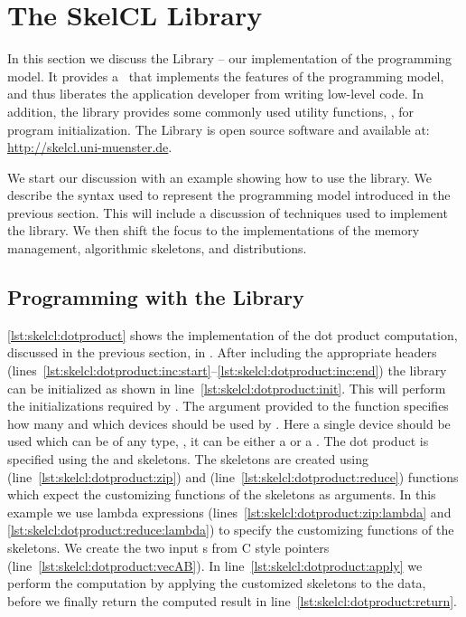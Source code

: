 \section{The SkelCL Library}
\label{section:skelcl-library}
In this section we discuss the \SkelCL Library -- our implementation of the \SkelCL programming model.
It provides a \Cpp~\API that implements the features of the \SkelCL programming model, and thus liberates the application developer from writing low-level code.
In addition, the library provides some commonly used utility functions, \eg, for program initialization.
The \SkelCL Library is open source software and available at: \url{http://skelcl.uni-muenster.de}.

We start our discussion with an example showing how to use the \SkelCL library.
We describe the syntax used to represent the \SkelCL programming model introduced in the previous section.
This will include a discussion of \Cpp techniques used to implement the library.
We then shift the focus to the implementations of the memory management, algorithmic skeletons, and distributions.










\subsection{Programming with the \SkelCL Library}

\autoref{lst:skelcl:dotproduct} shows the implementation of the dot product computation, discussed in the previous section, in \SkelCL.
After including the appropriate \SkelCL headers (lines~\autoref{lst:skelcl:dotproduct:inc:start}--\autoref{lst:skelcl:dotproduct:inc:end}) the \SkelCL library can be initialized as shown in line~\autoref{lst:skelcl:dotproduct:init}.
This will perform the initializations required by \OpenCL.
The argument provided to the  function specifies how many and which \OpenCL devices should be used by \SkelCL.
Here a single device should be used which can be of any type, \ie, it can be either a \CPU or a \GPU.
The dot product is specified using the \zip and \reduce skeletons.
The skeletons are created using  (line~\autoref{lst:skelcl:dotproduct:zip}) and  (line~\autoref{lst:skelcl:dotproduct:reduce}) functions which expect the customizing functions of the skeletons as arguments.
In this example we use \Cpp lambda expressions (lines~\autoref{lst:skelcl:dotproduct:zip:lambda} and \autoref{lst:skelcl:dotproduct:reduce:lambda}) to specify the customizing functions of the skeletons.
We create the two input s from C style pointers (line~\autoref{lst:skelcl:dotproduct:vecAB}).
In line~\autoref{lst:skelcl:dotproduct:apply} we perform the computation by applying the customized skeletons to the data, before we finally return the computed result in line~\autoref{lst:skelcl:dotproduct:return}.

